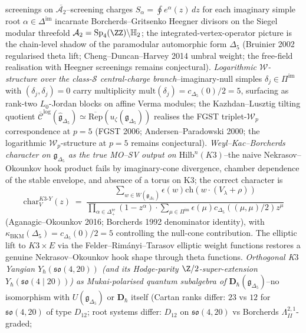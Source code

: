 \begin{remark}
{screenings on $\overline{\mathcal A_2}$}--screening charges
$S_\alpha = \oint e^\alpha(z)\,dz$ for each imaginary simple root
$\alpha\in\Delta^{\mathrm{im}}$ incarnate Borcherds--Gritsenko Heegner
divisors on the Siegel modular threefold
$\mathcal A_2 = \mathrm{Sp}_4(\ZZ)\backslash\mathbb H_2$; the
integrated-vertex-operator picture is the chain-level shadow of the
paramodular automorphic form $\Delta_5$ (Bruinier 2002 regularised
theta lift; Cheng--Duncan--Harvey 2014 umbral weight;
the free-field realisation with Heegner screenings remains conjectural).
\emph{Logarithmic \(\mathcal W\)-structure over the class-\(\mathcal S\)
central-charge branch}--imaginary-null simples
$\delta_j\in\Pi^{\mathrm{im}}$ with $(\delta_j,\delta_j)=0$ carry
multiplicity $\mathrm{mult}(\delta_j) = c_{\Delta_5}(0)/2 = 5$,
surfacing as rank-two $L_0$-Jordan blocks on affine Verma modules; the
Kazhdan--Lusztig tilting quotient
$\overline{\mathcal C}^{\log}(\hat{\mathfrak g}_{\Delta_5}) \simeq
\overline{\mathrm{Rep}}(u_\zeta(\mathfrak g_{\Delta_5}))$ realises the
FGST triplet-$\mathcal W_p$ correspondence at $p=5$ (FGST 2006;
Andersen--Paradowski 2000;
the logarithmic $\mathcal W_p$-structure at $p=5$ remains conjectural).
\emph{Weyl--Kac--Borcherds character on $\mathfrak g_{\Delta_5}$ as
the true MO--SV output on $\mathrm{Hilb}^n(K3)$}--the naive
Nekrasov--Okounkov hook product fails by imaginary-cone divergence,
chamber dependence of the stable envelope, and absence of a torus on
K3; the correct character is
\[
 \mathrm{char}^{K3\text{-}Y}_V(z)
 \;=\;
 \frac{\sum_{w\in W(\mathfrak g_{\Delta_5})}\epsilon(w)\mathrm{ch}(w\cdot(V_\lambda+\rho))}
 {\prod_{\alpha\in\Delta^{\mathrm{re}}_+}(1-z^\alpha)\cdot
 \sum_{\mu\in\Pi^{\mathrm{im}}}\epsilon(\mu)c_{\Delta_5}((\mu,\mu)/2)z^\mu}
\]
(Aganagic--Okounkov 2016; Borcherds 1992 denominator identity), with
$\kappa_{\mathrm{BKM}}(\Delta_5) = c_{\Delta_5}(0)/2 = 5$ controlling
the null-cone contribution. The elliptic lift to $K3\times E$ via the
Felder--Rim\'anyi--Tarasov elliptic weight functions restores a genuine
Nekrasov--Okounkov hook shape through theta functions.
\emph{Orthogonal K$3$ Yangian $Y_\hbar(\mathfrak{so}(4, 20))$ (and
its Hodge-parity $\Z/2$-super-extension
$Y_\hbar(\mathfrak{so}(4 \mid 20))$) as Mukai-polarised quantum
subalgebra of $\mathbf D_\hbar(\mathfrak g_{\Delta_5})$}--no
isomorphism with $U(\mathfrak g_{\Delta_5})$ or $\mathbf D_\hbar$
itself (Cartan ranks differ: $23$ vs $12$ for $\mathfrak{so}(4, 20)$
of type $D_{12}$; root systems differ: $D_{12}$ on
$\mathfrak{so}(4, 20)$ vs Borcherds $\Lambda^{2,1}_{II}$-graded;

\end{remark}
